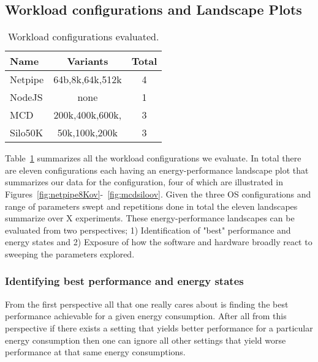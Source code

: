 \subsection{Workload configurations and Landscape Plots}
\begin{table}[h]
\centering
\begin{tabular}{l|c|c}
  Name & Variants & Total  \\
  \hline
  Netpipe & 64b,8k,64k,512k & 4\\ \hline

  NodeJS &  none & 1\\ \hline
  MCD & 200k,400k,600k, & 3\\ \hline
  Silo50K & 50k,100k,200k & 3\\ \hline
\end{tabular}
\caption{Workload configurations evaluated.}
\label{table:wrkcfgs}	
\end{table}

Table~\ref{table:wrkcfgs} summarizes all the workload configurations we evaluate.  In total there are eleven configurations each having an energy-performance landscape plot that summarizes our data for the configuration, 
 four of which are illustrated in Figures~\ref{fig:netpipe8Kov}-~\ref{fig:mcdsiloov}.  Given the three OS configurations and range of parameters swept and repetitions done in total the eleven landscapes summarize over X experiments. 
These energy-performance landscapes can be evaluated from two perspectives; 1) Identification of "best" performance and energy states and 2) Exposure of how the software and hardware broadly react to sweeping the parameters explored. 

\subsubsection{Identifying best performance and energy states}
From the first perspective all that one really cares about is finding the best performance achievable for a given energy consumption.  After all from this perspective if there exists a setting that yields better performance for a particular energy consumption then one can ignore all other settings that yield worse performance at that same energy consumptions. 

